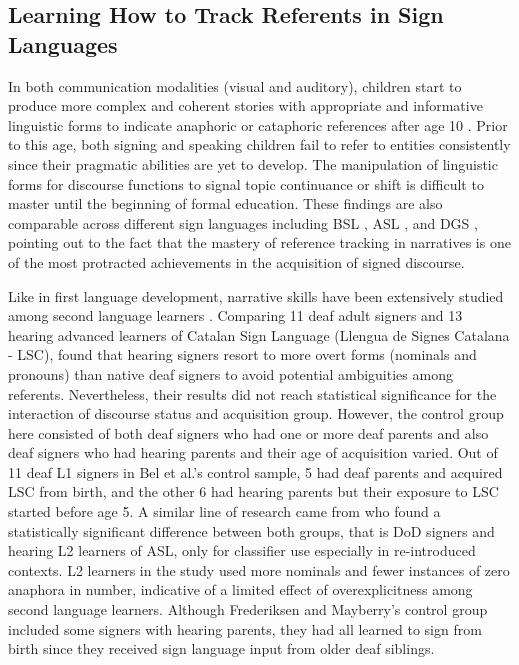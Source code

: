 \documentclass[review]{elsarticle} %
\begin{document}
\hypertarget{learning-how-to-track-referents-in-sign-languages}{%
\subsection{Learning How to Track Referents in Sign
Languages}\label{learning-how-to-track-referents-in-sign-languages}}

In both communication modalities (visual and auditory), children start
to produce more complex and coherent stories with appropriate and
informative linguistic forms to indicate anaphoric or cataphoric
references after age 10 \citep{hickmann1996, rathmann2007}. Prior to
this age, both signing and speaking children fail to refer to entities
consistently since their pragmatic abilities are yet to develop. The
manipulation of linguistic forms for discourse functions to signal topic
continuance or shift is difficult to master until the beginning of
formal education. These findings are also comparable across different
sign languages including BSL \citep{morgan2005}, ASL \citep{loew1984},
and DGS \citep{becker2009}, pointing out to the fact that the mastery of
reference tracking in narratives is one of the most protracted
achievements in the acquisition of signed discourse.

Like in first language development, narrative skills have been
extensively studied among second language learners
\citep[see][]{bel2015, frederiksen2019}. Comparing 11 deaf adult signers
and 13 hearing advanced learners of Catalan Sign Language (Llengua de
Signes Catalana - LSC), \citet{bel2015} found that hearing signers
resort to more overt forms (nominals and pronouns) than native deaf
signers to avoid potential ambiguities among referents. Nevertheless,
their results did not reach statistical significance for the interaction
of discourse status and acquisition group. However, the control group
here consisted of both deaf signers who had one or more deaf parents and
also deaf signers who had hearing parents and their age of acquisition
varied. Out of 11 deaf L1 signers in Bel et al.'s \citeyearpar{bel2015}
control sample, 5 had deaf parents and acquired LSC from birth, and the
other 6 had hearing parents but their exposure to LSC started before age
5. A similar line of research came from \citet{frederiksen2019} who
found a statistically significant difference between both groups, that
is DoD signers and hearing L2 learners of ASL, only for classifier use
especially in re-introduced contexts. L2 learners in the study used more
nominals and fewer instances of zero anaphora in number, indicative of a
limited effect of overexplicitness among second language learners.
Although Frederiksen and Mayberry's control group included some signers
with hearing parents, they had all learned to sign from birth since they
received sign language input from older deaf siblings.
\end{document}
